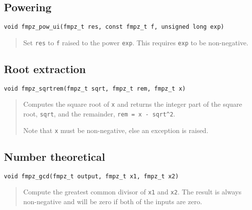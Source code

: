 \documentclass[a4paper,10pt]{article}
\newcommand{\code}{\lstinline}
\begin{document}
\subsection{Powering}

\begin{lstlisting}
void fmpz_pow_ui(fmpz_t res, const fmpz_t f, unsigned long exp)
\end{lstlisting}
\begin{quote}
Set \code{res} to \code{f} raised to the power \code{exp}. This requires \code{exp} to be non-negative.
\end{quote}

\subsection{Root extraction}

\begin{lstlisting}
void fmpz_sqrtrem(fmpz_t sqrt, fmpz_t rem, fmpz_t x)
\end{lstlisting}
\begin{quote}
Computes the square root of \code{x} and returns the integer part of the square root, \code{sqrt}, and the remainder, \code{rem = x - sqrt^2}. 

Note that \code{x} must be non-negative, else an exception is raised.
\end{quote}

\subsection{Number theoretical}

\begin{lstlisting}
void fmpz_gcd(fmpz_t output, fmpz_t x1, fmpz_t x2)
\end{lstlisting}
\begin{quote}
Compute the greatest common divisor of \code{x1} and \code{x2}. The result is always non-negative and will be zero if both of the inputs are zero.
\end{quote}
\end{document}
